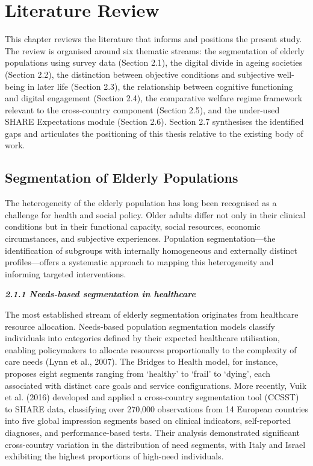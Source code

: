 \chapter{Literature Review}
\label{ch:ch2}

This chapter reviews the literature that informs and positions the present study. The review is organised around six thematic streams: the segmentation of elderly populations using survey data (Section 2.1), the digital divide in ageing societies (Section 2.2), the distinction between objective conditions and subjective well-being in later life (Section 2.3), the relationship between cognitive functioning and digital engagement (Section 2.4), the comparative welfare regime framework relevant to the cross-country component (Section 2.5), and the under-used SHARE Expectations module (Section 2.6). Section 2.7 synthesises the identified gaps and articulates the positioning of this thesis relative to the existing body of work.

\section{Segmentation of Elderly Populations}
The heterogeneity of the elderly population has long been recognised as a challenge for health and social policy. Older adults differ not only in their clinical conditions but in their functional capacity, social resources, economic circumstances, and subjective experiences. Population segmentation---the identification of subgroups with internally homogeneous and externally distinct profiles---offers a systematic approach to mapping this heterogeneity and informing targeted interventions.

\emph{\textbf{2.1.1 Needs-based segmentation in healthcare}}

The most established stream of elderly segmentation originates from healthcare resource allocation. Needs-based population segmentation models classify individuals into categories defined by their expected healthcare utilisation, enabling policymakers to allocate resources proportionally to the complexity of care needs (Lynn et al., 2007). The Bridges to Health model, for instance, proposes eight segments ranging from `healthy' to `frail' to `dying', each associated with distinct care goals and service configurations. More recently, Vuik et al. (2016) developed and applied a cross-country segmentation tool (CCSST) to SHARE data, classifying over 270,000 observations from 14 European countries into five global impression segments based on clinical indicators, self-reported diagnoses, and performance-based tests. Their analysis demonstrated significant cross-country variation in the distribution of need segments, with Italy and Israel exhibiting the highest proportions of high-need individuals.

